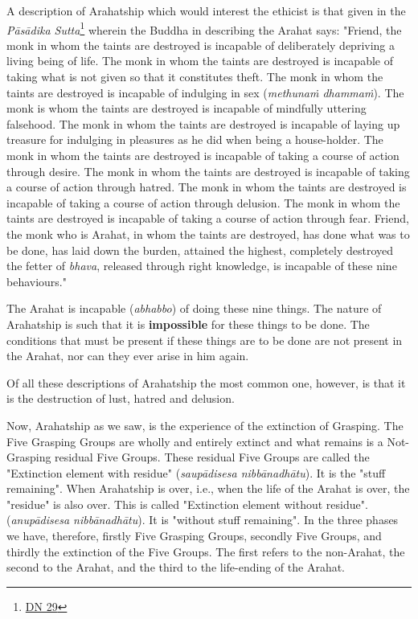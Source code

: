 A description of Arahatship which would interest the ethicist is that given in the \emph{Pāsādika Sutta}\footnote{\href{https://suttacentral.net/dn29/en/sujato}{DN 29}} wherein the Buddha in describing the Arahat says: "Friend, the monk in whom the taints are destroyed is incapable of deliberately depriving a living being of life. The monk in whom the taints are destroyed is incapable of taking what is not given so that it constitutes theft. The monk in whom the taints are destroyed is incapable of indulging in sex (\emph{methunaṁ dhammaṁ}). The monk is whom the taints are destroyed is incapable of mindfully uttering falsehood. The monk in whom the taints are destroyed is incapable of laying up treasure for indulging in pleasures as he did when being a house-holder. The monk in whom the taints are destroyed is incapable of taking a course of action through desire. The monk in whom the taints are destroyed is incapable of taking a course of action through hatred. The monk in whom the taints are destroyed is incapable of taking a course of action through delusion. The monk in whom the taints are destroyed is incapable of taking a course of action through fear. Friend, the monk who is Arahat, in whom the taints are destroyed, has done what was to be done, has laid down the burden, attained the highest, completely destroyed the fetter of \emph{bhava}, released through right knowledge, is incapable of these nine behaviours."

The Arahat is incapable (\emph{abhabbo}) of doing these nine things. The nature of Arahatship is such that it is \textbf{impossible} for these things to be done. The conditions that must be present if these things are to be done are not present in the Arahat, nor can they ever arise in him again.

Of all these descriptions of Arahatship the most common one, however, is that it is the destruction of lust, hatred and delusion.

\protect\hypertarget{remainder}{}{}Now, Arahatship as we saw, is the experience of the extinction of Grasping. The Five Grasping Groups are wholly and entirely extinct and what remains is a Not-Grasping residual Five Groups. These residual Five Groups are called the "Extinction element with residue" (\emph{saupādisesa nibbānadhātu}). It is the "stuff remaining". When Arahatship is over, i.e., when the life of the Arahat is over, the "residue" is also over. This is called "Extinction element without residue". (\emph{anupādisesa nibbānadhātu}). It is "without stuff remaining". In the three phases we have, therefore, firstly Five Grasping Groups, secondly Five Groups, and thirdly the extinction of the Five Groups. The first refers to the non-Arahat, the second to the Arahat, and the third to the life-ending of the Arahat.

